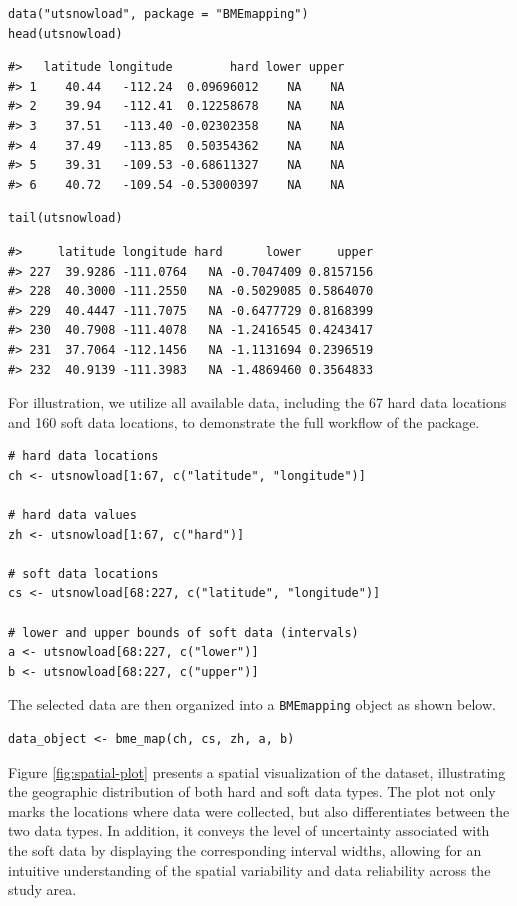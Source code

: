 \begin{verbatim}
data("utsnowload", package = "BMEmapping")
head(utsnowload)
\end{verbatim}

\begin{verbatim}
#>   latitude longitude        hard lower upper
#> 1    40.44   -112.24  0.09696012    NA    NA
#> 2    39.94   -112.41  0.12258678    NA    NA
#> 3    37.51   -113.40 -0.02302358    NA    NA
#> 4    37.49   -113.85  0.50354362    NA    NA
#> 5    39.31   -109.53 -0.68611327    NA    NA
#> 6    40.72   -109.54 -0.53000397    NA    NA
\end{verbatim}

\begin{verbatim}
tail(utsnowload)
\end{verbatim}

\begin{verbatim}
#>     latitude longitude hard      lower     upper
#> 227  39.9286 -111.0764   NA -0.7047409 0.8157156
#> 228  40.3000 -111.2550   NA -0.5029085 0.5864070
#> 229  40.4447 -111.7075   NA -0.6477729 0.8168399
#> 230  40.7908 -111.4078   NA -1.2416545 0.4243417
#> 231  37.7064 -112.1456   NA -1.1131694 0.2396519
#> 232  40.9139 -111.3983   NA -1.4869460 0.3564833
\end{verbatim}

For illustration, we utilize all available data, including the 67 hard data locations and 160 soft data locations, to demonstrate the full workflow of the package.

\begin{verbatim}
# hard data locations
ch <- utsnowload[1:67, c("latitude", "longitude")]

# hard data values
zh <- utsnowload[1:67, c("hard")]

# soft data locations
cs <- utsnowload[68:227, c("latitude", "longitude")]

# lower and upper bounds of soft data (intervals)
a <- utsnowload[68:227, c("lower")]
b <- utsnowload[68:227, c("upper")]
\end{verbatim}

The selected data are then organized into a \texttt{BMEmapping} object as shown below.

\begin{verbatim}
data_object <- bme_map(ch, cs, zh, a, b)
\end{verbatim}

Figure \ref{fig:spatial-plot} presents a spatial visualization of the dataset, illustrating the geographic distribution of both hard and soft data types. The plot not only marks the locations where data were collected, but also differentiates between the two data types. In addition, it conveys the level of uncertainty associated with the soft data by displaying the corresponding interval widths, allowing for an intuitive understanding of the spatial variability and data reliability across the study area.

